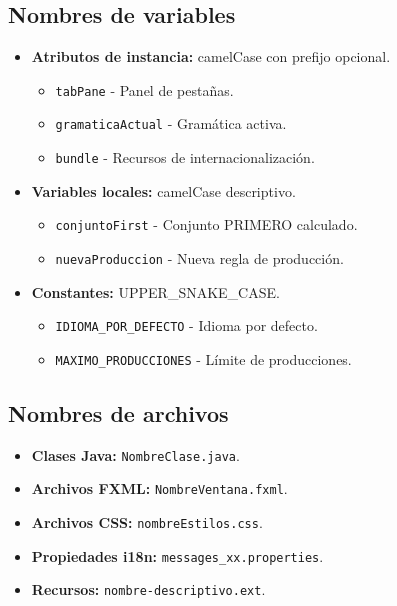 \subsection{Nombres de variables}

\begin{itemize}
    \item \textbf{Atributos de instancia:} camelCase con prefijo opcional.
    \begin{itemize}
        \item \texttt{tabPane} - Panel de pestañas.
        \item \texttt{gramaticaActual} - Gramática activa.
        \item \texttt{bundle} - Recursos de internacionalización.
    \end{itemize}
    \item \textbf{Variables locales:} camelCase descriptivo.
    \begin{itemize}
        \item \texttt{conjuntoFirst} - Conjunto PRIMERO calculado.
        \item \texttt{nuevaProduccion} - Nueva regla de producción.
    \end{itemize}
    \item \textbf{Constantes:} UPPER\_SNAKE\_CASE.
    \begin{itemize}
        \item \texttt{IDIOMA\_POR\_DEFECTO} - Idioma por defecto.
        \item \texttt{MAXIMO\_PRODUCCIONES} - Límite de producciones.
    \end{itemize}
\end{itemize}

\subsection{Nombres de archivos}

\begin{itemize}
    \item \textbf{Clases Java:} \texttt{NombreClase.java}.
    \item \textbf{Archivos FXML:} \texttt{NombreVentana.fxml}.
    \item \textbf{Archivos CSS:} \texttt{nombreEstilos.css}.
    \item \textbf{Propiedades i18n:} \texttt{messages\_xx.properties}.
    \item \textbf{Recursos:} \texttt{nombre-descriptivo.ext}.
\end{itemize}

